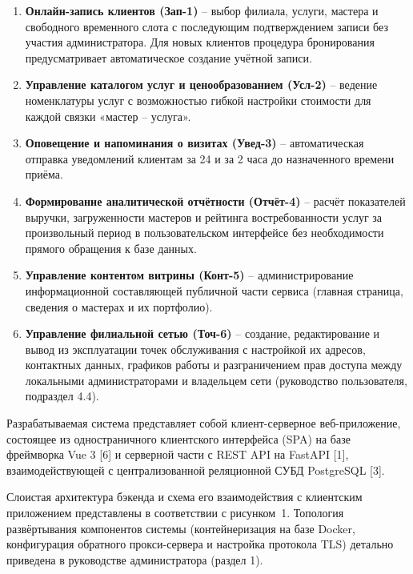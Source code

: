 \begin{enumerate}
  \item \textbf{Онлайн-запись клиентов (Зап-1)} -- выбор филиала, услуги,
        мастера и свободного временного слота с последующим
        подтверждением записи без участия администратора. Для новых
        клиентов процедура бронирования предусматривает автоматическое
        создание учётной записи.
  \item \textbf{Управление каталогом услуг и ценообразованием (Усл-2)} --
        ведение номенклатуры услуг с возможностью гибкой настройки
        стоимости для каждой связки «мастер -- услуга».
  \item \textbf{Оповещение и напоминания о визитах (Увед-3)} --
        автоматическая отправка уведомлений клиентам за 24 и за 2 часа до
        назначенного времени приёма.
  \item \textbf{Формирование аналитической отчётности (Отчёт-4)} --
        расчёт показателей выручки, загруженности мастеров и рейтинга
        востребованности услуг за произвольный период в пользовательском
        интерфейсе без необходимости прямого обращения к базе данных.
  \item \textbf{Управление контентом витрины (Конт-5)} -- администрирование
        информационной составляющей публичной части сервиса (главная
        страница, сведения о мастерах и их портфолио).
  \item \textbf{Управление филиальной сетью (Точ-6)} -- создание,
        редактирование и вывод из эксплуатации точек обслуживания с
        настройкой их адресов, контактных данных, графиков работы и
        разграничением прав доступа между локальными администраторами и
        владельцем сети (руководство пользователя, подраздел 4.4).
\end{enumerate}



Разрабатываемая система представляет собой клиент-серверное
веб-приложение, состоящее из одностраничного клиентского интерфейса (SPA)
на базе фреймворка Vue 3 [6] и серверной части с REST API на FastAPI
[1], взаимодействующей с централизованной реляционной СУБД PostgreSQL
[3].

Слоистая архитектура бэкенда и схема его взаимодействия с клиентским
приложением представлены в соответствии с рисунком~1. Топология развёртывания
компонентов системы (контейнеризация на базе Docker, конфигурация
обратного прокси-сервера и настройка протокола TLS) детально приведена в
руководстве администратора (раздел 1).

